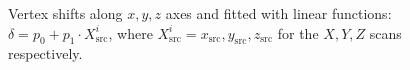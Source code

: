 \begin{figure}
	\centering
	\caption[Vertex shifts along $x, y, z$ axes and fitted with linear functions.]{Vertex shifts along $x, y, z$ axes and fitted with linear functions: $\delta = p_0+ p_1\cdot X^i_\mathrm{src}$, where $X^i_\mathrm{src}=x_\mathrm{src},y_\mathrm{src},z_\mathrm{src}$ for the $X,Y,Z$ scans respectively.\label{fig:vertexScale}}
\end{figure}


